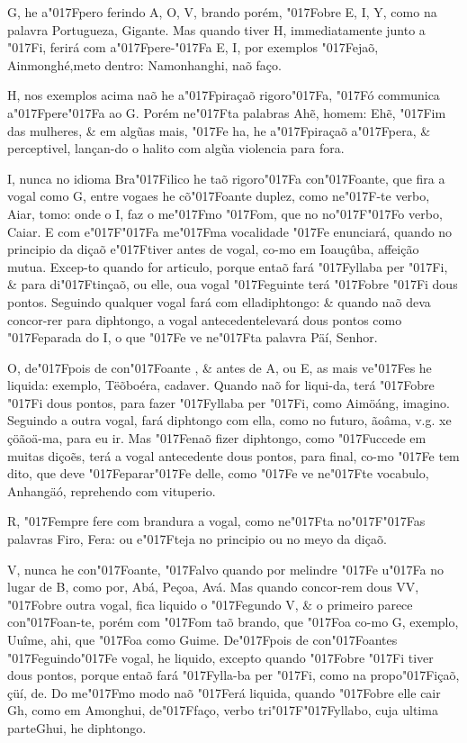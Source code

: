 \documentclass[openany,titlepage,12pt]{book}
\newcommand{\lgS}{\char"017F}
\newcommand{\lgSS}{\char"017F\char"017F}
\begin{document}
G, he a\lgS pero ferindo A, O, V, brando porém, \lgS obre E, I, Y,
como na palavra Portugueza, Gigante. Mas quando tiver H,
immediatamente junto a \lgS i, ferirá com a\lgS pere-\lgS a
E, I, por exemplos \lgS ejaõ, Ainmonghé,\linebreak meto dentro:
Namonhanghi, naõ faço.

H, nos exemplos acima naõ he a\lgS piraçaõ rigoro\lgS a, \lgS ó
communica a\lgS pere\lgS a ao G. Porém ne\lgS ta palabras Ahẽ,
homem: Ehẽ, \lgS im das mulheres, \& em algũas mais, \lgS e ha,
he a\lgS piraçaõ a\lgS pera, \& perceptivel, lançan-do o halito
com algũa violencia para fora.

I, nunca no idioma Bra\lgS ilico he taõ rigoro\lgS a con\lgS oante,
que fira a vogal como G, entre vogaes he cõ\lgS oante duplez, como
ne\lgS -te verbo, Aiar, tomo: onde o I, faz o me\lgS mo \lgS om,
que no no\lgSS o verbo, Caiar. E com e\lgSS a me\lgS ma vocalidade 
\lgS e enunciará, quando no principio da diçaõ e\lgS tiver antes de
vogal, co-mo em Ioauçûba, affeição mutua. Excep-to quando for
articulo, porque entaõ fará \lgS yllaba per \lgS i, \& para
di\lgS tinçaõ, ou elle, ou\linebreak a vogal \lgS eguinte terá
\lgS obre \lgS i dous pontos. Seguindo qualquer vogal fará 
com ella\linebreak diphtongo: \& quando naõ deva concor-rer
para diphtongo, a vogal antecedente\linebreak levará dous pontos
como \lgS eparada do I, o que \lgS e ve ne\lgS ta palavra
Päí, Senhor.

O, de\lgS pois de con\lgS oante , \& antes de A, ou E, as mais
ve\lgS es he liquida: exemplo, Tëõboéra, cadaver. Quando naõ for
liqui-da, terá \lgS obre \lgS i dous pontos, para fazer \lgS yllaba
per \lgS i, como Aimöáng, imagino. Seguindo a outra vogal, fará 
diphtongo com ella, como no futuro, ãoâma, v.g. xe çöãoä-ma, para
eu ir. Mas \lgS enaõ fizer diphtongo, como \lgS uccede em muitas
diçoẽs, terá a vogal antecedente dous pontos, para final, co-mo
\lgS e tem dito, que deve \lgS eparar\lgS e delle, como \lgS e ve
ne\lgS te vocabulo, Anhangäó, reprehendo com vituperio.

R, \lgS empre fere com brandura a vogal, como ne\lgS ta no\lgSS as
palavras Firo, Fera: ou e\lgS teja no principio ou no meyo da diçaõ.

V, nunca he con\lgS oante, \lgS alvo quando por melindre \lgS e 
u\lgS a no lugar de B, como por, Abá, Peçoa, Avá. Mas quando
concor-rem dous VV, \lgS obre outra vogal, fica liquido o 
\lgS egundo V, \& o primeiro parece con\lgS oan-te, porém com
\lgS om taõ brando, que \lgS oa co-mo G, exemplo, Uuîme, ahi, que
\lgS oa como Guime. De\lgS pois de con\lgS oantes 
\lgS eguindo\lgS e vogal, he liquido, excepto quando
\lgS obre \lgS i tiver dous pontos, porque entaõ fará
\lgS ylla-ba per \lgS i, como na propo\lgS içaõ, çüí, de.
Do me\lgS mo modo naõ \lgS erá liquida, quando \lgS obre
elle cair Gh, como em Amonghui, de\lgS faço, verbo
tri\lgSS yllabo, cuja ultima parte\linebreak Ghui, he diphtongo.
\end{document}
